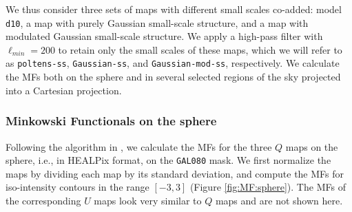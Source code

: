 \documentclass[twocolumn]{aastex631}
\begin{document}



We thus consider three sets of maps with different small scales co-added: model \texttt{d10}, a map with purely Gaussian small-scale structure, and a map with modulated Gaussian small-scale structure. %
We apply a high-pass filter with $\ell_{min} = 200$ to retain only the small scales of these maps, which we will refer to as \texttt{poltens-ss}, \texttt{Gaussian-ss}, and \texttt{Gaussian-mod-ss}, respectively. We calculate the MFs both on the sphere and in several selected regions of the sky projected into a Cartesian projection. 


\subsubsection{Minkowski Functionals on the sphere}

Following the algorithm in \cite{Grewal:2022}, we calculate the MFs for the three $Q$ maps on the sphere, i.e., in HEALPix format, on the \texttt{GAL080} mask. We first normalize the maps by dividing each map by its standard deviation, and compute the MFs for iso-intensity contours in the range $[-3, 3]$ (Figure \ref{fig:MF:sphere}).  
The MFs of the corresponding $U$ maps look very similar to $Q$ maps and are not shown here.
\end{document}
